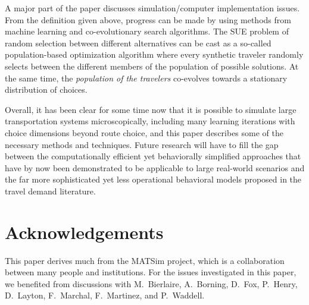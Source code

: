 A major part of the paper discusses simulation/computer implementation issues.
From the definition given above, progress can be made by using methods
from machine learning and co-evolutionary search algorithms.  
%
The SUE problem of random selection between different alternatives can
be cast as a so-called population-based optimization algorithm where
every synthetic traveler randomly selects between the different
members of the population of possible solutions.
%
At the same time, the \emph{population of the travelers} co-evolves
towards a stationary distribution of choices.


Overall, it has been clear for some time now that it is possible to
simulate large transportation systems microscopically, including many
learning iterations with choice dimensions beyond route choice, and
this paper describes some of the necessary methods and techniques.
%
Future research will have to fill the gap between the computationally
efficient yet behaviorally simplified approaches that have by now been
demonstrated to be applicable to large real-world scenarios and the
far more sophisticated yet less operational behavioral models proposed 
in the travel demand literature.

\section{Acknowledgements}

This paper derives much from the MATSim project, which is a
collaboration between many people and institutions.  For the issues
investigated in this paper, we benefited from discussions with
%
M.~Bierlaire,
A.~Borning, %
D.~Fox, %
P.~Henry, %
D.~Layton, %
F.~Marchal, 
F.~Martinez,
%
and P.~Waddell.



